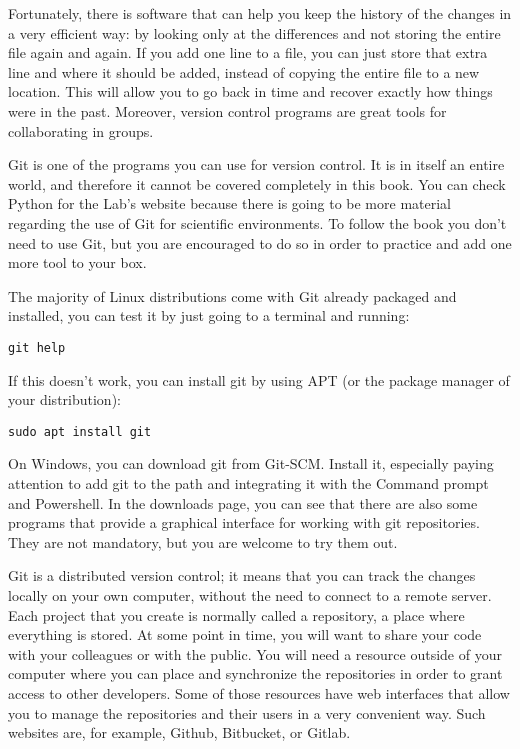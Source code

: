 Fortunately, there is software that can help you keep the history of the changes in a very efficient way: by looking only at the differences and not storing the entire file again and again. If you add one line to a file, you can just store that extra line and where it should be added, instead of copying the entire file to a new location. This will allow you to go back in time and recover exactly how things were in the past. Moreover, version control programs are great tools for collaborating in groups.

Git is one of the programs you can use for version control. It is in itself an entire world, and therefore it cannot be covered completely in this book. You can check Python for the Lab’s website because there is going to be more material regarding the use of Git for scientific environments. To follow the book you don’t need to use Git, but you are encouraged to do so in order to practice and add one more tool to your box.

The majority of Linux distributions come with Git already packaged and installed, you can test it by just going to a terminal and running:
\begin{verbatim}
git help
\end{verbatim}
If this doesn’t work, you can install git by using APT (or the package manager of your distribution):
\begin{verbatim}
sudo apt install git
\end{verbatim}

On Windows, you can download git from Git-SCM. Install it, especially paying attention to add git to the path and integrating it with the Command prompt and Powershell. In the downloads page, you can see that there are also some programs that provide a graphical interface for working with git repositories. They are not mandatory, but you are welcome to try them out.

Git is a distributed version control; it means that you can track the changes locally on your own computer, without the need to connect to a remote server. Each project that you create is normally called a repository, a place where everything is stored. At some point in time, you will want to share your code with your colleagues or with the public. You will need a resource outside of your computer where you can place and synchronize the repositories in order to grant access to other developers. Some of those resources have web interfaces that allow you to manage the repositories and their users in a very convenient way. Such websites are, for example, Github, Bitbucket, or Gitlab.

